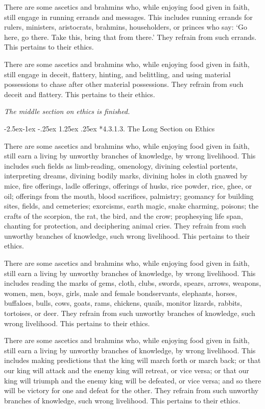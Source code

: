 \documentclass[12pt,openany]{book}%
\makeatletter
\renewcommand\paragraph{\@startsection{paragraph}{4}{\z@}%
            {-2.5ex\@plus -1ex \@minus -.25ex}%
            {1.25ex \@plus .25ex}%
            {\noindent\Semiboldnormalfont\normalsize}}
\newcommand*{\scendsection}[1]{\begin{center}\textit{#1}\end{center}}
\makeatother
\begin{document}
There are some ascetics and brahmins who, while enjoying food given in faith, still engage in running errands and messages. This includes running errands for rulers, ministers, aristocrats, brahmins, householders, or princes who say: ‘Go here, go there. Take this, bring that from there.’ They refrain from such errands. This pertains to their ethics. 

There are some ascetics and brahmins who, while enjoying food given in faith, still engage in deceit, flattery, hinting, and belittling, and using material possessions to chase after other material possessions. They refrain from such deceit and flattery. This pertains to their ethics. 

\scendsection{The middle section on ethics is finished. }

\paragraph*{4.3.1.3. The Long Section on Ethics }

There are some ascetics and brahmins who, while enjoying food given in faith, still earn a living by unworthy branches of knowledge, by wrong livelihood. This includes such fields as limb-reading, omenology, divining celestial portents, interpreting dreams, divining bodily marks, divining holes in cloth gnawed by mice, fire offerings, ladle offerings, offerings of husks, rice powder, rice, ghee, or oil; offerings from the mouth, blood sacrifices, palmistry; geomancy for building sites, fields, and cemeteries; exorcisms, earth magic, snake charming, poisons; the crafts of the scorpion, the rat, the bird, and the crow; prophesying life span, chanting for protection, and deciphering animal cries. They refrain from such unworthy branches of knowledge, such wrong livelihood. This pertains to their ethics. 

There are some ascetics and brahmins who, while enjoying food given in faith, still earn a living by unworthy branches of knowledge, by wrong livelihood. This includes reading the marks of gems, cloth, clubs, swords, spears, arrows, weapons, women, men, boys, girls, male and female bondservants, elephants, horses, buffaloes, bulls, cows, goats, rams, chickens, quails, monitor lizards, rabbits, tortoises, or deer. They refrain from such unworthy branches of knowledge, such wrong livelihood. This pertains to their ethics. 

There are some ascetics and brahmins who, while enjoying food given in faith, still earn a living by unworthy branches of knowledge, by wrong livelihood. This includes making predictions that the king will march forth or march back; or that our king will attack and the enemy king will retreat, or vice versa; or that our king will triumph and the enemy king will be defeated, or vice versa; and so there will be victory for one and defeat for the other. They refrain from such unworthy branches of knowledge, such wrong livelihood. This pertains to their ethics. 
\end{document}
